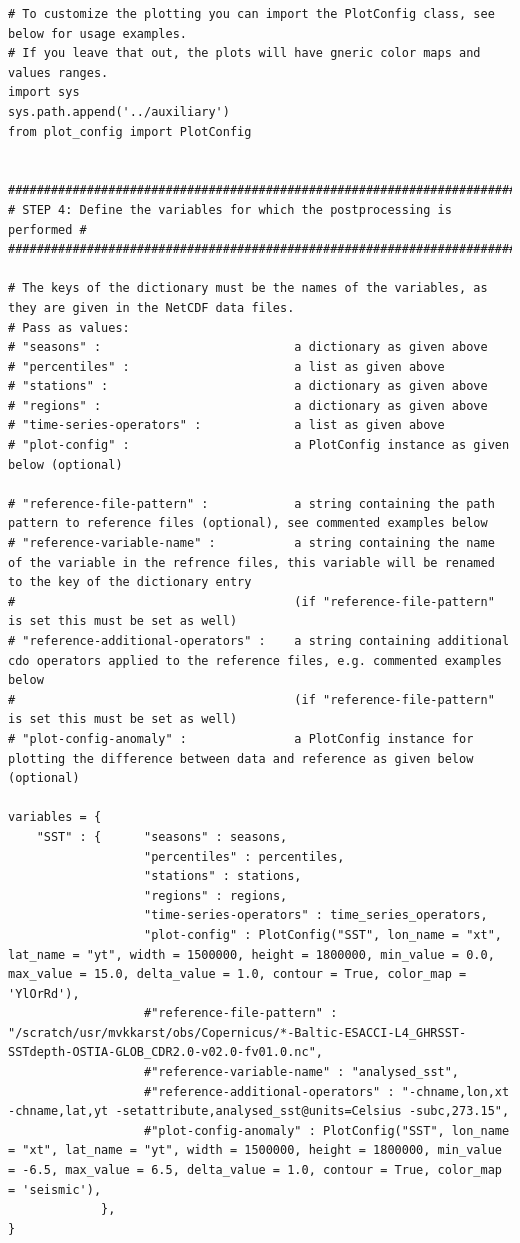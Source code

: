 \documentclass[a4paper,titlepage]{scrartcl}
\begin{document}
\begin{verbatim}
# To customize the plotting you can import the PlotConfig class, see below for usage examples.
# If you leave that out, the plots will have gneric color maps and values ranges.
import sys
sys.path.append('../auxiliary')
from plot_config import PlotConfig

    
##########################################################################
# STEP 4: Define the variables for which the postprocessing is performed #
##########################################################################

# The keys of the dictionary must be the names of the variables, as they are given in the NetCDF data files.
# Pass as values:
# "seasons" :                           a dictionary as given above
# "percentiles" :                       a list as given above
# "stations" :                          a dictionary as given above
# "regions" :                           a dictionary as given above
# "time-series-operators" :             a list as given above
# "plot-config" :                       a PlotConfig instance as given below (optional)

# "reference-file-pattern" :            a string containing the path pattern to reference files (optional), see commented examples below
# "reference-variable-name" :           a string containing the name of the variable in the refrence files, this variable will be renamed to the key of the dictionary entry 
#                                       (if "reference-file-pattern" is set this must be set as well)
# "reference-additional-operators" :    a string containing additional cdo operators applied to the reference files, e.g. commented examples below
#                                       (if "reference-file-pattern" is set this must be set as well)
# "plot-config-anomaly" :               a PlotConfig instance for plotting the difference between data and reference as given below (optional)

variables = {
    "SST" : {      "seasons" : seasons,
                   "percentiles" : percentiles, 
                   "stations" : stations,
                   "regions" : regions,
                   "time-series-operators" : time_series_operators,
                   "plot-config" : PlotConfig("SST", lon_name = "xt", lat_name = "yt", width = 1500000, height = 1800000, min_value = 0.0, max_value = 15.0, delta_value = 1.0, contour = True, color_map = 'YlOrRd'),
                   #"reference-file-pattern" : "/scratch/usr/mvkkarst/obs/Copernicus/*-Baltic-ESACCI-L4_GHRSST-SSTdepth-OSTIA-GLOB_CDR2.0-v02.0-fv01.0.nc",
                   #"reference-variable-name" : "analysed_sst",
                   #"reference-additional-operators" : "-chname,lon,xt -chname,lat,yt -setattribute,analysed_sst@units=Celsius -subc,273.15",
                   #"plot-config-anomaly" : PlotConfig("SST", lon_name = "xt", lat_name = "yt", width = 1500000, height = 1800000, min_value = -6.5, max_value = 6.5, delta_value = 1.0, contour = True, color_map = 'seismic'),
             },
}
\end{verbatim}
\end{document}
